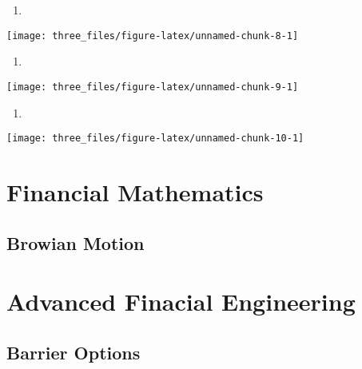 \documentclass[
]{book}
\providecommand{\tightlist}{%
  \setlength{\itemsep}{0pt}\setlength{\parskip}{0pt}}
\theoremstyle{definition}
\theoremstyle{definition}
\theoremstyle{definition}
\theoremstyle{remark}
\begin{document}
\begin{enumerate}
\def\labelenumi{(\alph{enumi})}
\setcounter{enumi}{3}
\tightlist
\item
\end{enumerate}

\begin{center}\texttt{[image: three\_files/figure-latex/unnamed-chunk-8-1]} \end{center}

\begin{enumerate}
\def\labelenumi{(\alph{enumi})}
\setcounter{enumi}{4}
\tightlist
\item
\end{enumerate}

\begin{center}\texttt{[image: three\_files/figure-latex/unnamed-chunk-9-1]} \end{center}

\begin{enumerate}
\def\labelenumi{(\alph{enumi})}
\setcounter{enumi}{5}
\tightlist
\item
\end{enumerate}

\begin{center}\texttt{[image: three\_files/figure-latex/unnamed-chunk-10-1]} \end{center}

\hypertarget{part-financial-mathematics}{%
\part{Financial Mathematics}\label{part-financial-mathematics}}

\hypertarget{browian-motion}{%
\chapter{Browian Motion}\label{browian-motion}}

\hypertarget{part-advanced-finacial-engineering}{%
\part{Advanced Finacial Engineering}\label{part-advanced-finacial-engineering}}

\hypertarget{barrier-options}{%
\chapter{Barrier Options}\label{barrier-options}}
\end{document}
